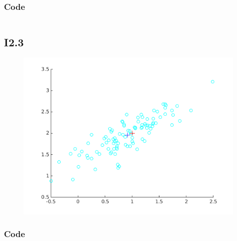 \documentclass{article}
\begin{document}
\subsubsection{Code}

\inputminted{matlab}{part1/i22john.m}

\subsection{I2.3}


\begin{figure}[h!]
    \centering
    \includegraphics[width=\textwidth]{part1/I231.png}
    \caption{}
    \label{fig:I3.1}
\end{figure}

\subsubsection{Code}

\inputminted{matlab}{part1/i23john.m}
\end{document}
